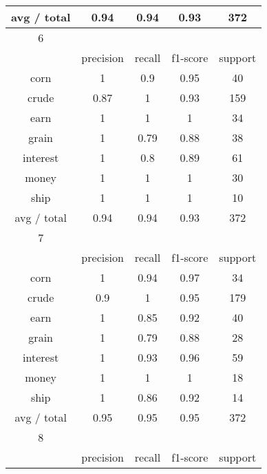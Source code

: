 \documentclass[11pt]{article}
\begin{document}
\begin{center}
\begin{longtable}{| c | c | c | c | c |}
avg / total & 0.94      & 0.94   & 0.93     & 372     \\

\hline
6           &           &        &          &         \\
\hline
           & precision & recall & f1-score & support \\

corn        & 1         & 0.9    & 0.95     & 40      \\
crude       & 0.87      & 1      & 0.93     & 159     \\
earn        & 1         & 1      & 1        & 34      \\
grain       & 1         & 0.79   & 0.88     & 38      \\
interest    & 1         & 0.8    & 0.89     & 61      \\
money       & 1         & 1      & 1        & 30      \\
ship        & 1         & 1      & 1        & 10      \\

avg / total & 0.94      & 0.94   & 0.93     & 372     \\

\hline
7           &           &        &          &         \\
\hline
           & precision & recall & f1-score & support \\

corn        & 1         & 0.94   & 0.97     & 34      \\
crude       & 0.9       & 1      & 0.95     & 179     \\
earn        & 1         & 0.85   & 0.92     & 40      \\
grain       & 1         & 0.79   & 0.88     & 28      \\
interest    & 1         & 0.93   & 0.96     & 59      \\
money       & 1         & 1      & 1        & 18      \\
ship        & 1         & 0.86   & 0.92     & 14      \\

avg / total & 0.95      & 0.95   & 0.95     & 372     \\
\hline
8           &           &        &          &         \\
\hline
           & precision & recall & f1-score & support \\


\end{longtable}
\end{center}
\end{document}

